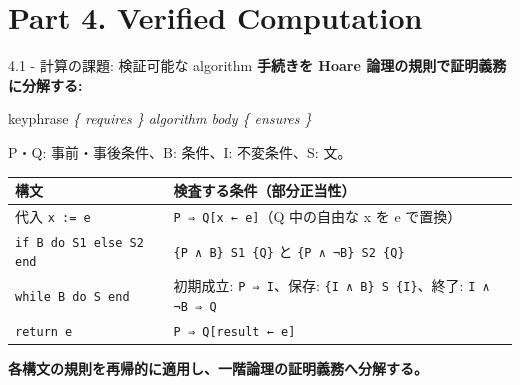 \documentclass[dvipdfmx,aspectratio=169,11pt]{beamer}
\begin{document}
\section{Part 4. Verified Computation}
\begin{frame}[fragile,t]{4.1 - 計算の課題: 検証可能な algorithm}
\smallskip
\textbf{手続きを Hoare 論理の規則で証明義務に分解する:}
\begin{center}
\begin{beamercolorbox}[rounded=true,sep=2.5mm,wd=0.9\textwidth]{keyphrase}
\centering\itshape \{ requires \}  algorithm body  \{ ensures \}
\end{beamercolorbox}
\end{center}
P・Q: 事前・事後条件、B: 条件、I: 不変条件、S: 文。

\par{}
\begin{footnotesize}
\setlength{\tabcolsep}{3pt}
\renewcommand{\arraystretch}{1.15}
\begin{tabularx}{\textwidth}{l>{\raggedright\arraybackslash}X}
\toprule
\textbf{構文} & \textbf{検査する条件（部分正当性）\footnotemark[1]} \\
\midrule
代入 \texttt{x := e} & \texttt{P ⇒ Q[x ← e]}（Q 中の自由な x を e で置換） \\
\texttt{if B do S1 else S2 end} & \texttt{\{P ∧ B\} S1 \{Q\}} と \texttt{\{P ∧ ¬B\} S2 \{Q\}} \\
\texttt{while B do S end} & 初期成立: \texttt{P ⇒ I}、保存: \texttt{\{I ∧ B\} S \{I\}}、終了: \texttt{I ∧ ¬B ⇒ Q} \\
\texttt{return e} & \texttt{P ⇒ Q[result ← e]} \\
\bottomrule
\end{tabularx}
\end{footnotesize}

\textcolor{blue!55!black}{\textbf{各構文の規則を再帰的に適用し、一階論理の証明義務へ分解する。}}


\end{frame}
\end{document}
